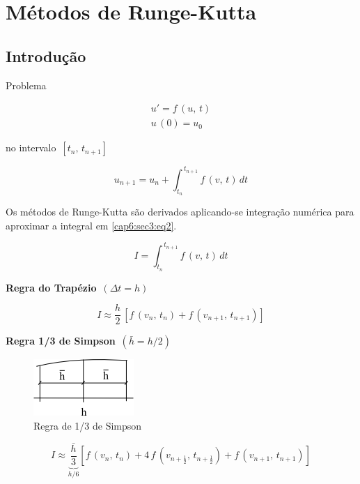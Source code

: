 \section{Métodos de Runge-Kutta}

\subsection{Introdução}

Problema

\begin{equation}
 \label{cap6:sec3:eq1}
 \begin{array}{l}
  u' = f \, (u, \, t) \\
  u \, (0) = u_0
 \end{array}
\end{equation}

no intervalo $ \, [t_n, \, t_{n+1}] \, $

\begin{equation}
 \label{cap6:sec3:eq2}
 u_{n+1} = u_n + \int^{\,t_{n+1}}_{t_n} f \, (v, \, t) \, dt
\end{equation}

Os métodos de Runge-Kutta são derivados aplicando-se integração numérica para aproximar a integral em \ref{cap6:sec3:eq2}.

\begin{equation}
 \label{cap6:sec3:eq3}
 I = \int^{\,t_{n+1}}_{t_n} f \, (v, \, t) \, dt
\end{equation}

\textbf{Regra do Trapézio} $ \, (\Delta t = h) $

\begin{equation}
 \label{cap6:sec3:eq4}
 I \approx \frac{h}{2} \, [f \, (v_n, \, t_n) + f \, (v_{n+1}, \, t_{n+1})]
\end{equation}

\textbf{Regra 1/3 de Simpson} $ \, (\bar{h} = h/2) $

\begin{figure}[htb]
 \centering
 \includegraphics[scale=1.0]{capitulos/capitulo6/figuras/met_runge_kutta1.png}
 \caption{Regra de 1/3 de Simpson}
 \label{fig:met_runge_kutta1}
\end{figure}

\begin{equation}
 \label{cap6:sec3:eq5}
 I \approx \underbrace{\frac{\bar{h}}{3}}_{h/6} [f \, (v_n, \, t_n) + 4 \, f \, (v_{n+\frac{1}{2}}, \, t_{n+\frac{1}{2}}) + f \, (v_{n+1}, \, t_{n+1})]
\end{equation}

